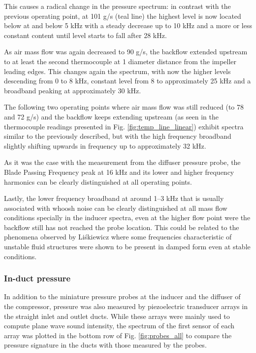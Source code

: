 This causes a radical change in the pressure spectrum: in contrast with the previous operating point, at 101 g/s (teal line) the highest level is now located below at and below 5 kHz with a steady decrease up to 10 kHz and a more or less constant content until level starts to fall after 28 kHz.

As air mass flow was again decreased to 90 g/s, the backflow extended upstream to at least the second thermocouple at 1 diameter distance from the impeller leading edges. This changes again the spectrum, with now the higher levels descending from 0 to 8 kHz, constant level from 8 to approximately 25 kHz and a broadband peaking at approximately 30 kHz.

The following two operating points where air mass flow was still reduced (to 78 and 72 g/s) and the backflow keeps extending upstream (as seen in the thermocouple readings presented in Fig. \ref{fig:temp_line_linear}) exhibit spectra similar to the previously described, but with the high frequency broadband slightly shifting upwards in frequency up to approximately 32 kHz.

As it was the case with the measurement from the diffuser pressure probe, the Blade Passing Frequency peak at 16 kHz and its lower and higher frequency harmonics can be clearly distinguished at all operating points. 

Lastly, the lower frequency broadband at around 1--3 kHz that is usually associated with whoosh noise can be clearly distinguished at all mass flow conditions specially in the inducer spectra, even at the higher flow point were the backflow still has not reached the probe location. This could be related to the phenomena observed by Li\'skiewicz \cite{liskiewicz2014identification} where some frequencies characteristic of unstable fluid structures were shown to be present in damped form even at stable conditions.

\subsubsection{In-duct pressure}

In addition to the miniature pressure probes at the inducer and the diffuser of the compressor, pressure was also measured by piezoelectric transducer arrays in the straight inlet and outlet ducts. While these arrays were mainly used to compute plane wave sound intensity, the spectrum of the first sensor of each array was plotted in the bottom row of Fig. \ref{fig:probes_all} to compare the pressure signature in the ducts with those measured by the  probes.

